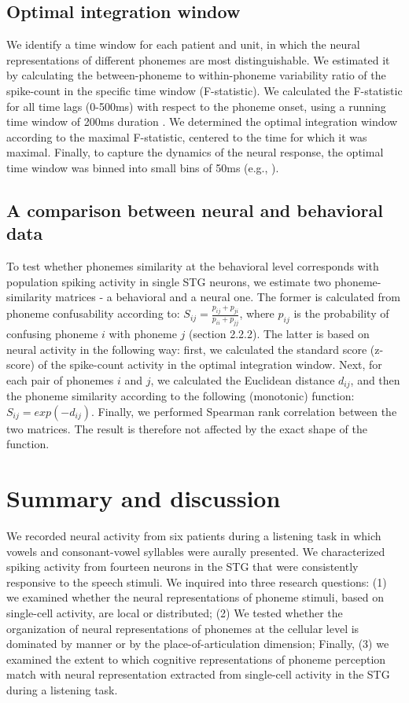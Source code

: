 \subsection{Optimal integration window}
We identify a time window for each patient and unit, in which the neural representations of different phonemes are most distinguishable. We estimated it by calculating the between-phoneme to within-phoneme variability ratio of the spike-count in the specific time window (F-statistic). We calculated the F-statistic for all time lags (0-500ms) with respect to the phoneme onset, using a running time window of 200ms duration \citep{cash2015emergence}. We determined the optimal integration window according to the maximal F-statistic, centered to the time for which it was maximal. Finally, to capture the dynamics of the neural response, the optimal time window was binned into small bins of 50ms (e.g., \citealp{Mesgarani2014}). 

\subsection{A comparison between neural and behavioral data}
To test whether phonemes similarity at the behavioral level corresponds with population spiking activity in single STG neurons, we estimate two phoneme-similarity matrices - a behavioral and a neural one. The former is calculated from phoneme confusability according to: $S_{ij}=\frac{p_{ij}+p_{ji}}{p_{ii}+p_{jj}}$, where $p_{ij}$ is the probability of confusing phoneme $i$ with phoneme $j$ (section 2.2.2). The latter is based on neural activity in the following way: first, we calculated the standard score (z-score) of the spike-count activity in the optimal integration window. Next, for each pair of phonemes $i$ and $j$, we calculated the Euclidean distance $d_{ij}$, and then the phoneme similarity according to the following (monotonic) function: $S_{ij}=exp(-d_{ij})$. Finally, we performed Spearman rank correlation between the two matrices. The result is therefore not affected by the exact shape of the function. 

\section{Summary and discussion}
We recorded neural activity from six patients during a listening task in which vowels and consonant-vowel syllables were aurally presented. We characterized spiking activity from fourteen neurons in the STG that were consistently responsive to the speech stimuli. We inquired into three research questions: (1) we examined whether the neural representations of phoneme stimuli, based on single-cell activity, are local or distributed; (2) We tested whether the organization of neural representations of phonemes at the cellular level is dominated by manner or by the place-of-articulation dimension; Finally, (3) we examined the extent to which cognitive representations of phoneme perception match with neural representation extracted from single-cell activity in the STG during a listening task.

